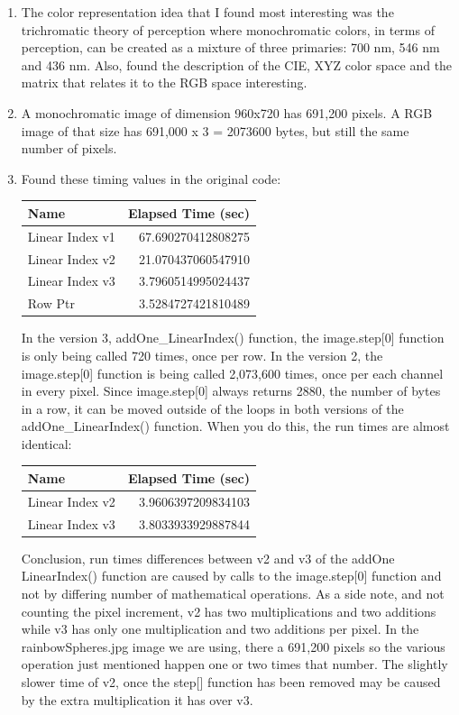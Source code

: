 \documentclass{article}
\begin{document}
\begin{enumerate}
\item
The color representation idea that I found most interesting was the trichromatic theory of perception where monochromatic colors, in terms of perception, can be created as a mixture of three primaries: 700 nm, 546 nm and 436 nm. Also, found the description of the CIE, XYZ color space and the matrix that relates it to the RGB space interesting.

\item
A monochromatic image of dimension 960x720 has 691,200 pixels. A RGB image of that size has 691,000 x 3 = 2073600 bytes, but still the same number of pixels.

\item
Found these timing values in the original code:

\begin{tabular}{| l | r |}
\hline
Name              & Elapsed Time (sec) \\
\hline
Linear Index v1  & 67.690270412808275   \\
\hline
Linear Index v2            & 21.070437060547910   \\
\hline
Linear Index v3           & 3.7960514995024437  \\
\hline
Row Ptr & 3.5284727421810489 \\
\hline
\end{tabular}

In the version 3, addOne_LinearIndex() function, the image.step[0] function is only being called 720 times, once per row. In the version 2, the image.step[0] function is being called 2,073,600 times, once per each channel in every pixel. Since image.step[0] always returns 2880, the number of bytes in a row, it can be moved outside of the loops in both versions of the addOne_LinearIndex() function. When you do this, the run times are almost identical:

\begin{tabular}{| l | r |}
\hline
Name              & Elapsed Time (sec) \\
\hline
Linear Index v2            & 3.9606397209834103   \\
\hline
Linear Index v3           & 3.8033933929887844  \\
\hline
\end{tabular}

Conclusion, run times differences between v2 and v3 of the addOne LinearIndex() function are caused by calls to the image.step[0] function and not by differing number of mathematical operations. As a side note, and not counting the pixel increment, v2 has two multiplications and two additions while v3 has only one multiplication and two additions per pixel. In the rainbowSpheres.jpg image we are using, there a 691,200 pixels so the various operation just mentioned happen one or two times that number. The slightly slower time of v2, once the step[] function has been removed may be caused by the extra multiplication it has over v3.


\end{enumerate}
\end{document}
